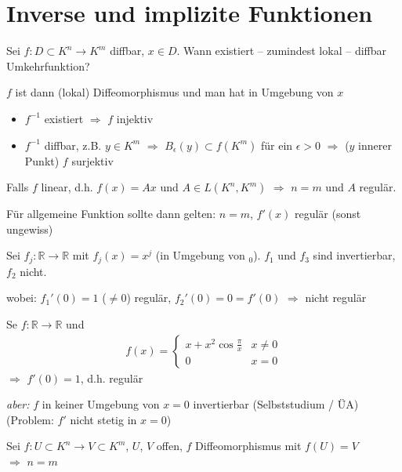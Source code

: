 \section{Inverse und implizite Funktionen}\setcounter{equation}{0}
\begin{boldenvironment}[Frage 1] Sei $f:D\subset K^n\to K^m$ \gls{diffbar}, $x\in D$. Wann existiert -- zumindest lokal -- \gls{diffbar} Umkehrfunktion?
\end{boldenvironment}

\begin{boldenvironment}[Vorbetrachtung]
	$f$ ist dann (lokal) Diffeomorphismus und man hat in Umgebung von $x$ \begin{itemize}
		\item $f^{-1}$ existiert $\Rightarrow$ $f$ injektiv
		\item $f^{-1}$ \gls{diffbar}, z.B. $y\in K^m$ $\Rightarrow$ $B_{\epsilon}(y)\subset f(K^m)$ für ein $\epsilon > 0$ $\Rightarrow$ ($y$ innerer Punkt) $f$ surjektiv
	\end{itemize}
\end{boldenvironment}

Falls $f$ linear, d.h. $f(x) = Ax$ und $A\in L(K^n, K^m)$ $\Rightarrow$ $n=m$ und $A$ regulär.

Für allgemeine Funktion sollte dann gelten: $n=m$, $f'(x)$ regulär (sonst ungewiss)

\begin{example}
	Sei $f_j:\mathbb{R}\to\mathbb{R}$ mit $f_j(x) = x^j$ (in Umgebung von $_0$). $f_1$ und $f_3$ sind invertierbar, $f_2$ nicht.
	
	wobei: $f_1'(0)=1$ ($\neq 0$) regulär, $f_2'(0) = 0 = f'(0)$ $\Rightarrow$ nicht regulär
\end{example}

\begin{example}
	Se $f:\mathbb{R}\to\mathbb{R}$ und \begin{align*}
		f(x) = \begin{cases}
			x + x^2\cos \frac{\pi}{x} & x\neq 0 \\ 0 & x=0
		\end{cases}
	\end{align*}
	$\Rightarrow$ $f'(0) = 1$, d.h. regulär
	
	\emph{aber:} $f$ in keiner Umgebung von $x=0$ invertierbar (Selbststudium / ÜA) (Problem: $f'$ nicht stetig in $x=0$)
\end{example}

\begin{lemma}
	Sei $f:U\subset K^n\to V\subset K^m$, $U$, $V$ offen, $f$ Diffeomorphismus mit $f(U) = V$\\
	$\Rightarrow$ $n = m$
\end{lemma}

